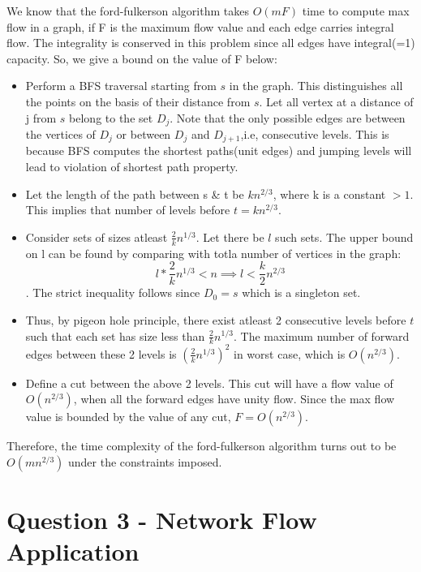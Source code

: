 \documentclass{article}
\begin{document}
We know that the ford-fulkerson algorithm takes $O(mF)$ time to compute max flow in a graph, if F is the maximum flow value and each edge carries integral flow. The integrality is conserved in this problem since all edges have integral(=1) capacity. So, we give a bound on the value of F below:

\begin{itemize}
    \item Perform a BFS traversal starting from $s$ in the graph. This distinguishes all the points on the basis of their distance from $s$. Let all vertex at a distance of j from $s$ belong to the set $D_j$. Note that the only possible edges are between the vertices of $D_j$ or between $D_j$ and $D_{j+1}$,i.e, consecutive levels. This is because BFS computes the shortest paths(unit edges) and jumping levels will lead to violation of shortest path property. 
    
    \item Let the length of the path between s \& t be $kn^{2/3}$, where k is a constant $> 1$. This implies that number of levels before $t = kn^{2/3}$.
    
    \item Consider sets of sizes atleast $\frac{2}{k}n^{1/3}$. Let there be $l$ such sets. The upper bound on l can be found by comparing with totla number of vertices in the graph:
    $$ l * \frac{2}{k}n^{1/3} < n \implies l < \frac{k}{2}n^{2/3}$$.
    The strict inequality follows since $D_0 = {s}$ which is a singleton set.
    
    \item Thus, by pigeon hole principle, there exist atleast 2 consecutive levels before $t$ such that each set has size less than $\frac{2}{k}n^{1/3}$. The maximum number of forward edges between these 2 levels is $(\frac{2}{k}n^{1/3})^2$ in worst case, which is $O(n^{2/3})$.
    
    \item Define a cut between the above 2 levels. This cut will have a flow value of $O(n^{2/3})$, when all the forward edges have unity flow. Since the max flow value is bounded by the value of any cut, $F = O(n^{2/3})$.
\end{itemize}

Therefore, the time complexity of the ford-fulkerson algorithm turns out to be $O(mn^{2/3})$ under the constraints imposed.
\pagebreak


\section{Question 3 - Network Flow Application}
\end{document}
